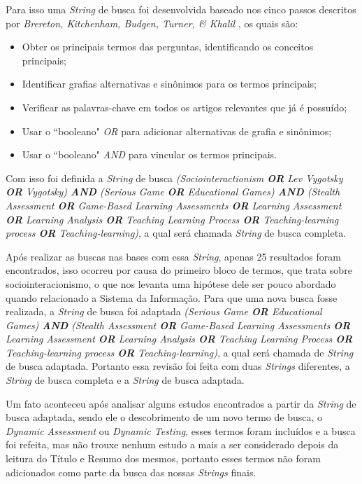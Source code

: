 \documentclass[12pt]{article}
\begin{document}
Para isso uma \textit{String} de busca foi desenvolvida baseado nos cinco passos descritos por \textit{Brereton, Kitchenham, Budgen, Turner, \& Khalil} \cite{brereton2007lessons}, os quais são:

\begin{itemize}
    \item Obter os principais termos das perguntas, identificando os conceitos principais;
    \item Identificar grafias alternativas e sinônimos para os termos principais;
    \item Verificar as palavras-chave em todos os artigos relevantes que já é possuído;
    \item Usar o ``booleano" \textit{OR} para adicionar alternativas de grafia e sinônimos;
    \item Usar o ``booleano" \textit{AND} para vincular os termos principais.
\end{itemize}

Com isso foi definida a \textit{String} de busca \textit{(Sociointeractionism \textbf{OR} Lev Vygotsky \textbf{OR} Vygotsky) \textbf{AND} (Serious Game \textbf{OR} Educational Games) \textbf{AND} (Stealth Assessment \textbf{OR} Game-Based Learning Assessments \textbf{OR} Learning Assessment \textbf{OR} Learning Analysis \textbf{OR} Teaching Learning Process \textbf{OR} Teaching-learning process \textbf{OR} Teaching-learning)}, a qual será chamada \textit{String} de busca completa.

Após realizar as buscas nas bases com essa \textit{String}, apenas 25 resultados foram encontrados, isso ocorreu por causa do primeiro bloco de termos, que trata sobre sociointeracionismo, o que nos levanta uma hipótese dele ser pouco abordado quando relacionado a Sistema da Informação. Para que uma nova busca fosse realizada, a \textit{String} de busca foi adaptada \textit{(Serious Game \textbf{OR} Educational Games) \textbf{AND} (Stealth Assessment \textbf{OR} Game-Based Learning Assessments \textbf{OR} Learning Assessment \textbf{OR} Learning Analysis \textbf{OR} Teaching Learning Process \textbf{OR} Teaching-learning process \textbf{OR} Teaching-learning)}, a qual será chamada de \textit{String} de busca adaptada. Portanto essa revisão foi feita com duas \textit{Strings} diferentes, a \textit{String} de busca completa e a \textit{String} de busca adaptada.

Um fato aconteceu após analisar alguns estudos encontrados a partir da \textit{String} de busca adaptada, sendo ele o descobrimento de um novo termo de busca, o \textit{Dynamic Assessment} ou \textit{Dynamic Testing}, esses termos foram incluídos e a busca foi refeita, mas não trouxe nenhum estudo a mais a ser considerado depois da leitura do Título e Resumo dos mesmos, portanto esses termos não foram adicionados como parte da busca das nossas \textit{Strings} finais.
\end{document}
